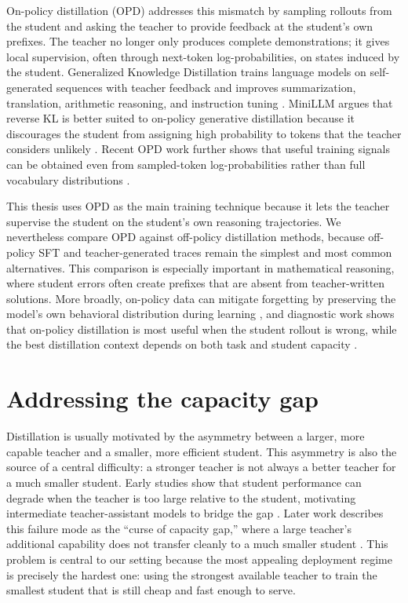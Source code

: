 On-policy distillation (OPD) addresses this mismatch by sampling rollouts from the student and asking the teacher to provide feedback at the student's own prefixes. The teacher no longer only produces complete demonstrations; it gives local supervision, often through next-token log-probabilities, on states induced by the student. Generalized Knowledge Distillation trains language models on self-generated sequences with teacher feedback and improves summarization, translation, arithmetic reasoning, and instruction tuning \cite{agarwalOnPolicyDistillationLanguage2024}. MiniLLM argues that reverse KL is better suited to on-policy generative distillation because it discourages the student from assigning high probability to tokens that the teacher considers unlikely \cite{guMiniLLMOnPolicyDistillation2026}. Recent OPD work further shows that useful training signals can be obtained even from sampled-token log-probabilities rather than full vocabulary distributions \cite{luOnPolicyDistillation2025}.

This thesis uses OPD as the main training technique because it lets the teacher supervise the student on the student's own reasoning trajectories. We nevertheless compare OPD against off-policy distillation methods, because off-policy SFT and teacher-generated traces remain the simplest and most common alternatives. This comparison is especially important in mathematical reasoning, where student errors often create prefixes that are absent from teacher-written solutions. More broadly, on-policy data can mitigate forgetting by preserving the model's own behavioral distribution during learning \cite{chenRetainingDoingRole2025}, and diagnostic work shows that on-policy distillation is most useful when the student rollout is wrong, while the best distillation context depends on both task and student capacity \cite{armandpourUnmaskingOnPolicyDistillation2026}.

\section{Addressing the capacity gap}
Distillation is usually motivated by the asymmetry between a larger, more capable teacher and a smaller, more efficient student. This asymmetry is also the source of a central difficulty: a stronger teacher is not always a better teacher for a much smaller student. Early studies \cite{mirzadehImprovedKnowledgeDistillation2019} show that student performance can degrade when the teacher is too large relative to the student, motivating intermediate teacher-assistant models to bridge the gap \cite{mirzadehImprovedKnowledgeDistillation2019}. Later work describes this failure mode as the ``curse of capacity gap,'' where a large teacher's additional capability does not transfer cleanly to a much smaller student \cite{zhangLiftingCurseCapacity2023}. This problem is central to our setting because the most appealing deployment regime is precisely the hardest one: using the strongest available teacher to train the smallest student that is still cheap and fast enough to serve.

